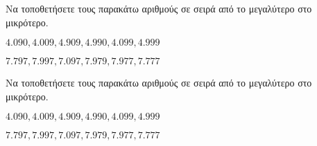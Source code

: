 Να τοποθετήσετε τους παρακάτω αριθμούς σε σειρά από το μεγαλύτερο στο μικρότερο.
\begin{rlist}
\item $ 4.090,4.009,4.909,4.990,4.099,4.999 $
\item $ 7.797,7.997,7.097,7.979,7.977,7.777 $
\end{rlist} 
Να τοποθετήσετε τους παρακάτω αριθμούς σε σειρά από το μεγαλύτερο στο μικρότερο.
\begin{rlist}
\item $ 4.090,4.009,4.909,4.990,4.099,4.999 $
\item $ 7.797,7.997,7.097,7.979,7.977,7.777 $
\end{rlist} 
